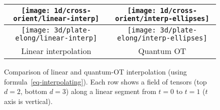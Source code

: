 \begin{figure}\centering
\begin{tabular}{@{}c@{}|@{}c@{}}
\texttt{[image: 1d/cross-orient/linear-interp]}&
\texttt{[image: 1d/cross-orient/interp-ellipses]}\\\hline
\texttt{[image: 3d/plate-elong/linear-interp]}&
\texttt{[image: 3d/plate-elong/interp-ellipses]}\\\hline
Linear interpolation & Quantum OT
\end{tabular}
\caption{Comparison of linear and quantum-OT interpolation (using formula~\eqref{eq-interpolating}). 
Each row shows a field of tensors (top $d=2$, bottom $d=3$) along a linear segment from $t=0$ to $t=1$ ($t$ axis is vertical).
} \label{fig:1d-interp}
\end{figure}
